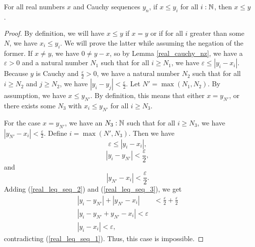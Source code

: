 \documentclass[../../math.tex]{subfiles}
\begin{document}
\begin{lemma} \label{real_leq_seq}
    For all real numbers $x$ and Cauchy sequences $y_n$, if $x \leq y_i$ for all
    $i : \mathbb{N}$, then $x \leq y$.
\end{lemma}
\begin{proof}
    By definition, we will have $x \leq y$ if $x = y$ or if for all $i$ greater
    than some $N$, we have $x_i \leq y_i$.  We will prove the latter while
    assuming the negation of the former.  If $x \neq y$, we have $0 \neq y - x$,
    so by Lemma \ref{real_cauchy_nz}, we have a $\varepsilon > 0$ and a natural
    number $N_1$ such that for all $i \geq N_1$, we have $\varepsilon \leq |y_i
    - x_i|$.  Because $y$ is Cauchy and $\frac{\varepsilon}{2} > 0$, we have a
    natural number $N_2$ such that for all $i \geq N_2$ and $j \geq N_2$, we
    have $|y_i - y_j| < \frac{\varepsilon}{2}$.  Let $N' = \max(N_1, N_2)$.  By
    assumption, we have $x \leq y_{N'}$.  By definition, this means that either
    $x = y_{N'}$, or there exists some $N_3$ with $x_i \leq y_{N'}$ for all $i
    \geq N_3$.

    For the case $x = y_{N'}$, we have an $N_3 : \mathbb{N}$ such that for all $i \geq
    N_3$, we have $|y_{N'} - x_i| < \frac{\varepsilon}{2}$.  Define $i =
    \max(N', N_3)$.  Then we have
    \begin{equation} \label{real_leq_seq_1}
        \varepsilon \leq |y_i - x_i|,
    \end{equation}
    \begin{equation} \label{real_leq_seq_2}
        |y_i - y_{N'}| < \frac{\varepsilon}{2},
    \end{equation}
    and
    \begin{equation} \label{real_leq_seq_3}
        |y_{N'} - x_i| < \frac{\varepsilon}{2}.
    \end{equation}
    Adding (\ref{real_leq_seq_2}) and (\ref{real_leq_seq_3}), we get
    \begin{align*}
        |y_i - y_{N'}| + |y_{N'} - x_i|
            &< \frac{\varepsilon}{2} + \frac{\varepsilon}{2} \\
        |y_i - y_{N'} + y_{N'} - x_i| < \varepsilon \\
        |y_i - x_i| < \varepsilon,
    \end{align*}
    contradicting (\ref{real_leq_seq_1}).  Thus, this case is impossible.


\end{proof}
\end{document}
